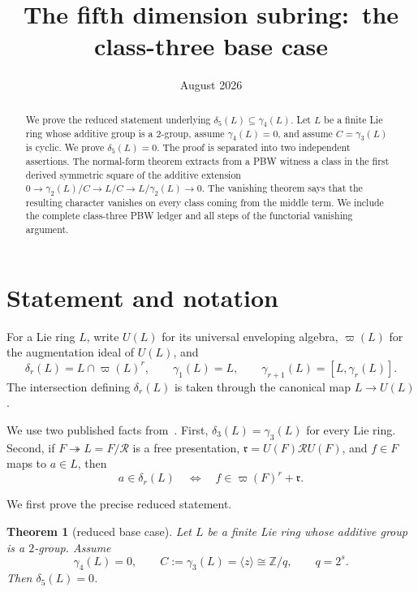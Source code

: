 \documentclass[11pt]{amsart}
\title[The fifth dimension subring]{The fifth dimension subring:\
the class-three base case}
\author{}
\date{August 2026}
\newtheorem{theorem}{Theorem}[section]
\theoremstyle{remark}
\newcommand{\Z}{\mathbb Z}
\newcommand{\gm}{\gamma}
\newcommand{\dlt}{\delta}
\newcommand{\aug}{\varpi}
\begin{document}
\begin{abstract}
We prove the reduced statement underlying
$\delta _5(L)\subseteq\gamma _4(L)$.  Let $L$ be a finite Lie ring
whose additive group is a $2$-group, assume $\gamma _4(L)=0$, and assume
$C=\gamma _3(L)$ is cyclic.  We prove $\delta _5(L)=0$.  The proof is
separated into two independent assertions.  The normal-form theorem
extracts from a PBW witness a class in the first derived symmetric
square of the additive extension
$0\to\gamma _2(L)/C\to L/C\to L/\gamma _2(L)\to0$.  The vanishing
theorem says that the resulting character vanishes on every class
coming from the middle term.  We include the complete class-three PBW
ledger and all steps of the functorial vanishing argument.
\end{abstract}

\maketitle

\section{Statement and notation}

For a Lie ring $L$, write $U(L)$ for its universal enveloping algebra,
$\aug(L)$ for the augmentation ideal of $U(L)$, and
\[
 \dlt_r(L)=L\cap\aug(L)^r,
 \qquad
 \gm_1(L)=L,
 \qquad
 \gm_{r+1}(L)=[L,\gm_r(L)].
\]
The intersection defining $\dlt_r(L)$ is taken through the canonical
map $L\to U(L)$.

We use two published facts from~\cite[Theorem~4.5 and
Proposition~4.2]{BP}.  First,
$\dlt_3(L)=\gm_3(L)$ for every Lie ring.  Second, if
$F\twoheadrightarrow L=F/\mathcal R$ is a free presentation,
$\mathfrak r=U(F)\mathcal R U(F)$, and $f\in F$ maps to $a\in L$, then
\begin{equation}\label{eq:free-criterion}
 a\in\dlt_r(L)
 \quad\Longleftrightarrow\quad
 f\in \aug(F)^r+\mathfrak r.
\end{equation}

We first prove the precise reduced statement.

\begin{theorem}[reduced base case]\label{thm:reduced}
Let $L$ be a finite Lie ring whose additive group is a $2$-group.
Assume
\[
                 \gm_4(L)=0,
 \qquad
 C:=\gm_3(L)=\langle z\rangle\cong\Z/q,
 \qquad q=2^s.
\]
Then $\dlt_5(L)=0$.
\end{theorem}
\end{document}
